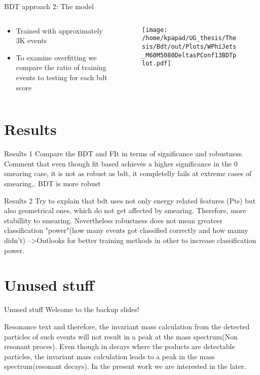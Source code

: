 \documentclass[bigger]{beamer}
\begin{document}
\begin{frame}[label={sec:org41d6c8b}]{BDT approach 2: The model}
\begin{columns}
\begin{column}{0.5\columnwidth}
\begin{itemize}
\item Trained with approximately 3K events
\item To examine overfitting we compare the ratio of training events to testing for each bdt score
\end{itemize}
\end{column}
\begin{column}{0.5\columnwidth}
  \begin{figure}[h!]
\centering
\texttt{[image: /home/kpapad/UG\_thesis/Thesis/Bdt/out/Plots/WPhiJets\_M60M5080DeltasPConf13BDTplot.pdf]}
\end{figure}
\end{column}
\end{columns}
\end{frame}

\section{Results}
\label{sec:orgc2b8f11}
\begin{frame}[label={sec:org919ff68}]{Results 1}
Compare the BDT and FIt in terms of significance and robustness. Comment that even though fit based achieves a higher significance in the 0 smearing case, it is not as robust as bdt, it completelly fails at extreme cases of smearing,. BDT is more robust 
\end{frame}
\begin{frame}[label={sec:org9caa6cd}]{Results 2}
Try to explain that bdt uses not only energy related features (Pts) but also geometrical ones, which do not get affected by smearing. Therefore, more stabillity to smearing. Nevertheless robustness does not mean greateer classification "power"(how many events got classified correctly and how manny didn't) -->Outlooks for better training methods in other to increase classification power.   
\end{frame}
\section{Unused stuff}
\label{sec:org46b950b}
\begin{frame}[label={sec:orgbc010a1}]{Unused stuff}
\alert{Welcome to the backup slides!}
\end{frame}
\begin{frame}[label={sec:org284248b}]{Resonance text}
and therefore, the invariant mass calculation from the detected particles of such events will not result in a peak at the mass spectrum(Non resonant proces). Even though in decays where  the poducts are detectable particles, the invariant mass calculation leads to a peak in the mass spectrum(resonant decays). In the present work we are interested in the later.
\end{frame}
\end{document}
